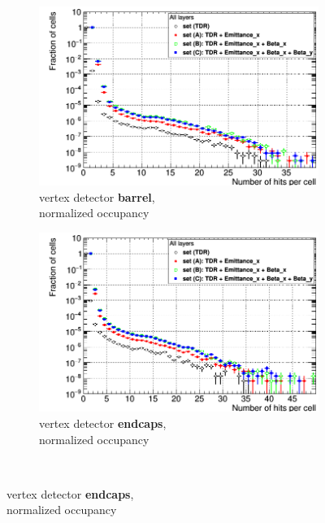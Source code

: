  \begin{figure}
 \captionsetup[subfigure]{justification=centering}
 \centering
  \begin{subfigure}[b]{0.49\textwidth}
   \centering
    \includegraphics[width=\textwidth]{Figures/Pairs/Occupancy_Comparison_All_layers_wrt_cells_ILC250_ALL_SETS_SiVertexBarrel_corrected_Barrel_size.png}
   \caption{\sid vertex detector \textbf{barrel},\\normalized occupancy}
   \end{subfigure}
   \hfill
   \begin{subfigure}[b]{0.49\textwidth}
   \centering
    \includegraphics[width=\textwidth]{Figures/Pairs/Occupancy_Comparison_All_layers_wrt_cells_ILC250_ALL_SETS_5T_w_antiDiD_SiVertexEndcap.png}
   \caption{\sid vertex detector \textbf{endcaps},\\normalized occupancy}
   \end{subfigure}\\

\end{figure}
